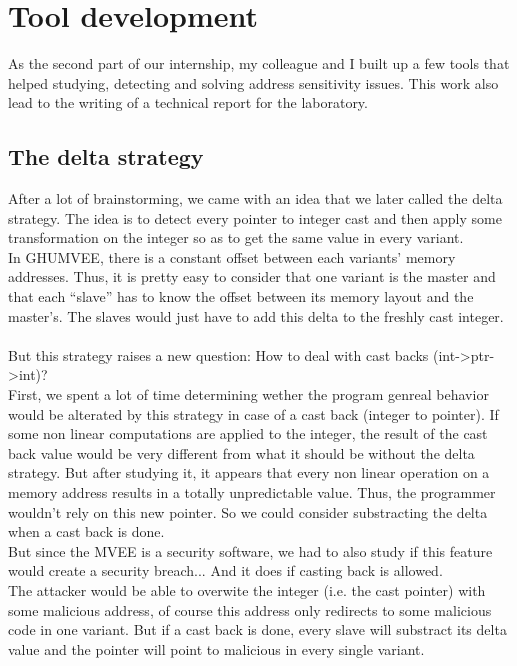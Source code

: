 \documentclass[english]{enstaPRE}
\begin{document}
\chapter{Tool development}

As the second part of our internship, my colleague and I built up a few tools that helped studying, detecting and solving address
sensitivity issues. This work also lead to the writing of a technical report for the laboratory.

\section{The delta strategy}

After a lot of brainstorming, we came with an idea that we later called the delta strategy.
The idea is to detect every pointer to integer cast and then apply some transformation on the integer so as to get the same value
in every variant. \\
In GHUMVEE, there is a constant offset between each variants' memory addresses. Thus, it is pretty easy to consider that one
variant is the master and that each ``slave'' has to know the offset between its memory layout and the master's.
The slaves would just have to add this delta to the freshly cast integer. \\ 
 \\
But this strategy raises a new question: How to deal with cast backs (int->ptr->int)? \\ First, we spent a lot of time determining wether the program
genreal behavior would be alterated by this strategy in case of a cast back (integer to pointer). If some non linear computations
are applied to the integer, the result of the cast back value would be very different from what it should be without the delta 
strategy. But after studying it, it appears that every non linear operation on a memory address results in a totally unpredictable
value. Thus, the programmer wouldn't rely on this new pointer. So we could consider substracting the delta when a cast back is done. \\
But since the MVEE is a security software, we had to also study if this feature would create a security breach... And it does if casting
back is allowed. \\ The attacker would be able to overwite the integer (i.e. the cast pointer) with some malicious address, of course
this address only redirects to some malicious code in one variant. But if a cast back is done, every slave will substract its delta
value and the pointer will point to malicious in every single variant. \\ 
 \\
\end{document}
